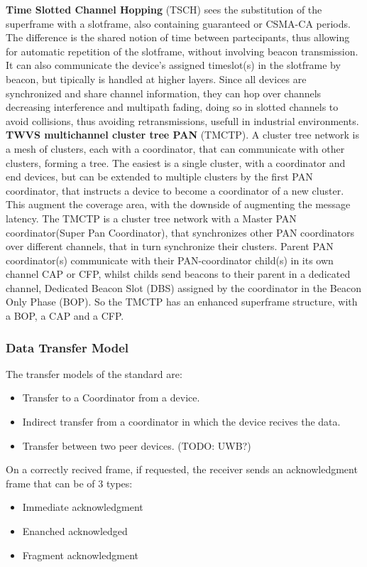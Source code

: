 \documentclass[conference]{IEEEtran}
\begin{document}
\textbf{Time Slotted Channel Hopping} (TSCH) sees the substitution of the superframe with a 
slotframe, also containing guaranteed or CSMA-CA periods. The difference is the shared notion 
of time between partecipants, thus allowing for automatic repetition of the slotframe, without 
involving beacon transmission. It can also communicate the device's assigned timeslot(s) in
the slotframe by beacon, but tipically is handled at higher layers.
Since all devices are synchronized and share channel information, they can hop over channels
decreasing interference and multipath fading, doing so in slotted channels to avoid collisions,
thus avoiding retransmissions, usefull in industrial environments.\\

\textbf{TWVS multichannel cluster tree PAN} (TMCTP).
A cluster tree network is a mesh of clusters, each with a coordinator,
that can communicate with other clusters, forming a tree. The easiest is a single cluster,
with a coordinator and end devices, but can be extended to multiple clusters
by the first PAN coordinator, that instructs a device to become a coordinator 
of a new cluster. This augment the coverage area, with the downside of augmenting the
message latency.
The TMCTP is a cluster tree network with a Master PAN coordinator(Super Pan Coordinator), that
synchronizes other PAN coordinators over different channels, that in turn synchronize
their clusters.
Parent PAN coordinator(s) communicate with their PAN-coordinator child(s) in its own channel 
CAP or CFP, whilst childs send beacons to their parent in a dedicated channel,
Dedicated Beacon Slot (DBS) assigned by the coordinator in the Beacon Only Phase (BOP).
So the TMCTP has an enhanced superframe structure, with a BOP, a CAP and a CFP.\\

\subsubsection{Data Transfer Model}
The transfer models of the standard are:
\begin{itemize}
    \item Transfer to a Coordinator from a device.
    \item Indirect transfer from a coordinator in which the device recives the data.
    \item Transfer between two peer devices. (TODO: UWB?)
\end{itemize}

On a correctly recived frame, if requested, the receiver sends an acknowledgment frame that 
can be of 3 types:
\begin{itemize}
    \item Immediate acknowledgment
    \item Enanched acknowledged
    \item Fragment acknowledgment
\end{itemize}
\end{document}
